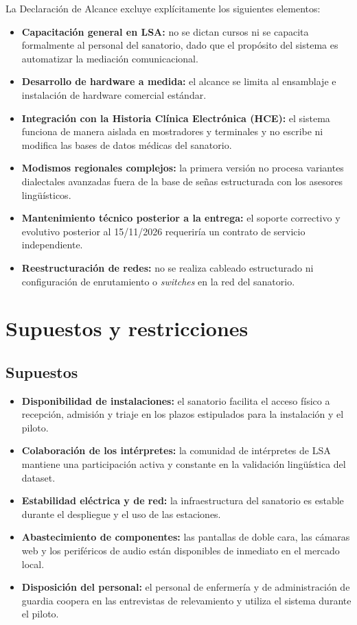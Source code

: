 La Declaración de Alcance excluye explícitamente los siguientes elementos:
\begin{itemize}
  \item \textbf{Capacitación general en LSA:} no se dictan cursos ni se capacita formalmente al personal del sanatorio, dado que el propósito del sistema es automatizar la mediación comunicacional.
  \item \textbf{Desarrollo de hardware a medida:} el alcance se limita al ensamblaje e instalación de hardware comercial estándar.
  \item \textbf{Integración con la Historia Clínica Electrónica (HCE):} el sistema funciona de manera aislada en mostradores y terminales y no escribe ni modifica las bases de datos médicas del sanatorio.
  \item \textbf{Modismos regionales complejos:} la primera versión no procesa variantes dialectales avanzadas fuera de la base de señas estructurada con los asesores lingüísticos.
  \item \textbf{Mantenimiento técnico posterior a la entrega:} el soporte correctivo y evolutivo posterior al 15/11/2026 requeriría un contrato de servicio independiente.
  \item \textbf{Reestructuración de redes:} no se realiza cableado estructurado ni configuración de enrutamiento o \emph{switches} en la red del sanatorio.
\end{itemize}

\section{Supuestos y restricciones}

\subsection{Supuestos}

\begin{itemize}
  \item \textbf{Disponibilidad de instalaciones:} el sanatorio facilita el acceso físico a recepción, admisión y triaje en los plazos estipulados para la instalación y el piloto.
  \item \textbf{Colaboración de los intérpretes:} la comunidad de intérpretes de LSA mantiene una participación activa y constante en la validación lingüística del dataset.
  \item \textbf{Estabilidad eléctrica y de red:} la infraestructura del sanatorio es estable durante el despliegue y el uso de las estaciones.
  \item \textbf{Abastecimiento de componentes:} las pantallas de doble cara, las cámaras web y los periféricos de audio están disponibles de inmediato en el mercado local.
  \item \textbf{Disposición del personal:} el personal de enfermería y de administración de guardia coopera en las entrevistas de relevamiento y utiliza el sistema durante el piloto.
\end{itemize}

